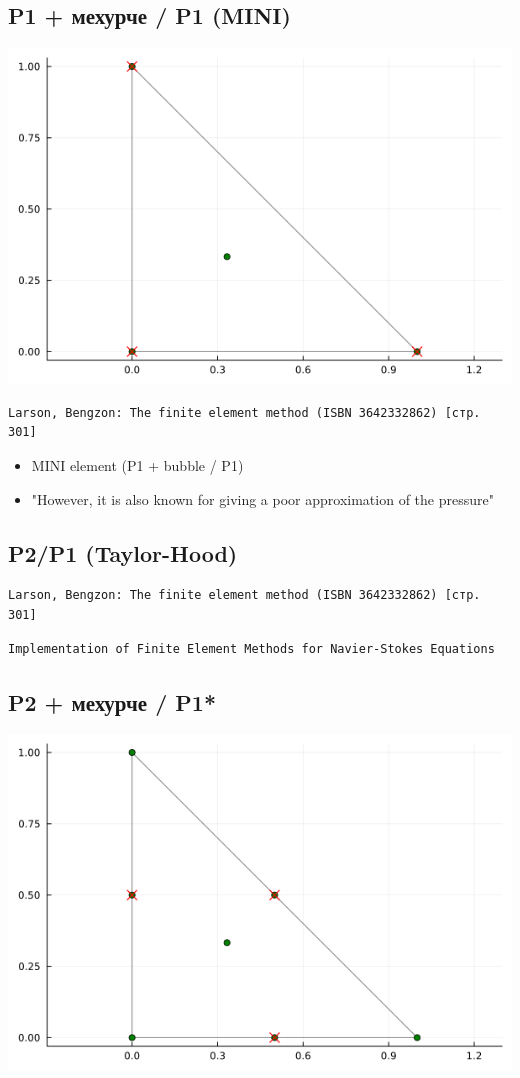 \documentclass[fleqn,12pt]{article}
\begin{document}
\subsection{P1 + мехурче / P1 (MINI)}
\includegraphics[width=140mm]{img/mini.png}
\begin{verbatim}
Larson, Bengzon: The finite element method (ISBN 3642332862) [стр. 301] 
\end{verbatim}
\begin{itemize}
    \item MINI element (P1 + bubble / P1)
    \item "However, it is also known for giving a poor approximation of the pressure"
\end{itemize}


\subsection{P2/P1 (Taylor-Hood)}
\begin{verbatim}
Larson, Bengzon: The finite element method (ISBN 3642332862) [стр. 301] 
\end{verbatim}
\begin{verbatim}
Implementation of Finite Element Methods for Navier-Stokes Equations
\end{verbatim}

\subsection{P2 + мехурче / P1*}
\includegraphics[width=140mm]{img/p2_bubble_p1.png}
\end{document}
